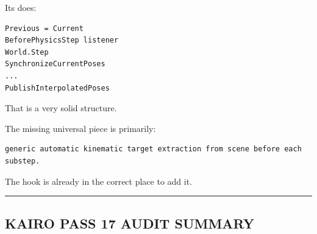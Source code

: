 Its  does:

\begin{verbatim}
Previous = Current
BeforePhysicsStep listener
World.Step
SynchronizeCurrentPoses
...
PublishInterpolatedPoses
\end{verbatim}

That is a very solid structure.

The missing universal piece is primarily:

\begin{verbatim}
generic automatic kinematic target extraction from scene before each substep.
\end{verbatim}

The hook is already in the correct place to add it.

\begin{center}\rule{0.5\linewidth}{0.5pt}\end{center}

\subsection{KAIRO PASS 17 AUDIT SUMMARY}\label{06-engine-ii-ch038-kairo-pass-17-audit-summary}

\hypertarget{06-engine-ii-ch038-kairo-pass-17-audit-summary}{}

